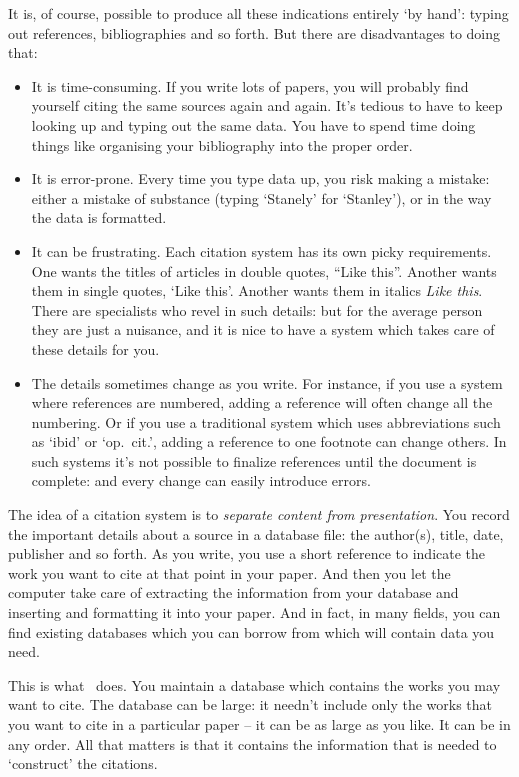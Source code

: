 It is, of course, possible to produce all these indications entirely `by hand': typing out references, bibliographies and so forth. But there are disadvantages to doing that:
\begin{itemize}
\item It is time-consuming. If you write lots of papers, you will probably find yourself citing the same sources again and again. It's tedious to have to keep looking up and typing out the same data. You have to spend time doing things like organising your bibliography into the proper order.
\item It is error-prone. Every time you type data up, you risk making a mistake: either a mistake of substance (typing `Stanely' for `Stanley'), or in the way the data is formatted.
\item It can be frustrating. Each citation system has its own picky requirements. One wants the titles of articles in double quotes, ``Like this''. Another wants them in single quotes, `Like this'. Another wants them in italics \emph{Like this}. There are specialists who revel in such details: but for the average person they are just a nuisance, and it is nice to have a system which takes care of these details for you.
\item The details sometimes change as you write. For instance, if you use a system where references are numbered, adding a reference will often change all the numbering. Or if you use a traditional system which uses abbreviations such as `ibid' or `op.\ cit.', adding a reference to one footnote can change others. In such systems it's not possible to finalize references until the document is complete: and every change can easily introduce errors.
\end{itemize}

The idea of a citation system is to \emph{separate content from presentation}. You record the important details about a source in a database file: the author(s), title, date, publisher and so forth. As you write, you use a short reference to indicate the work you want to cite at that point in your paper. And then you let the computer take care of extracting the information from your database and inserting and formatting it into your paper. And in fact, in many fields, you can find existing databases which you can borrow from which will contain data you need.

This is what \biblatex\ does. You maintain a database which contains the works you may want to cite. The database can be large: it needn't include only the works that you want to cite in a particular paper -- it can be as large as you like. It can be in any order. All that matters is that it contains the information that is needed to `construct' the citations.

